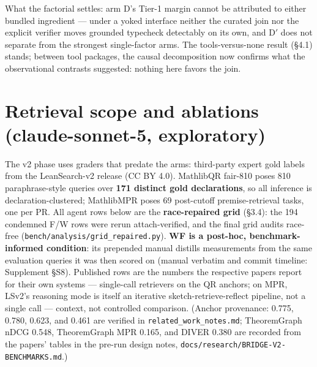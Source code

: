 \documentclass[10pt]{article}
\newcommand{\code}[1]{\texttt{#1}}
\newcommand{\Ssec}[1]{Supplement \S #1}
\begin{document}
What the factorial settles: arm D's Tier-1 margin cannot be attributed
to either bundled ingredient --- under a yoked interface neither the
curated join nor the explicit verifier moves grounded typecheck
detectably on its own, and D$'$ does not separate from the strongest
single-factor arms. The tools-versus-none result (\S 4.1) stands;
between tool packages, the causal decomposition now confirms what the
observational contrasts suggested: nothing here favors the join.

\section{Retrieval scope and ablations (claude-sonnet-5, exploratory)}
\label{sec:retrieval}

The v2 phase uses graders that predate the arms: third-party expert gold
labels from the LeanSearch-v2 release (CC BY 4.0). MathlibQR fair-810
poses 810 paraphrase-style queries over \textbf{171 distinct gold
declarations}, so all inference is declaration-clustered; MathlibMPR
poses 69 post-cutoff premise-retrieval tasks, one per PR. All agent rows
below are the \textbf{race-repaired grid} (\S 3.4): the 194 condemned
F/W rows were rerun attach-verified, and the final grid audits race-free
(\code{bench/analysis/grid\_repaired.py}). \textbf{WF is a post-hoc,
benchmark-informed condition}: its prepended manual distills
measurements from the same evaluation queries it was then scored on
(manual verbatim and commit timeline: \Ssec{S8}). Published rows are the
numbers the respective papers report for their own systems ---
single-call retrievers on the QR anchors; on MPR, LSv2's reasoning mode
is itself an iterative sketch-retrieve-reflect pipeline, not a single
call --- context, not controlled comparison. (Anchor provenance: 0.775,
0.780, 0.623, and 0.461 are verified in \code{related\_work\_notes.md};
TheoremGraph nDCG 0.548, TheoremGraph MPR 0.165, and DIVER 0.380 are
recorded from the papers' tables in the pre-run design notes,
\code{docs/research/BRIDGE-V2-BENCHMARKS.md}.)
\end{document}
